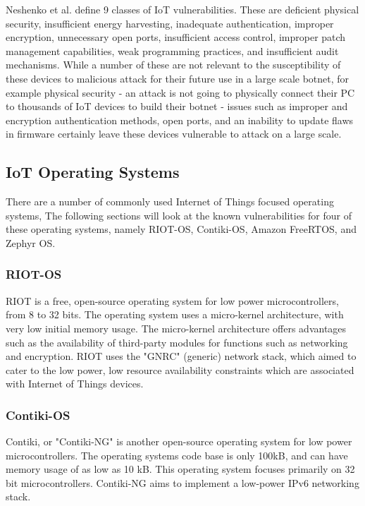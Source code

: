 Neshenko et al.\cite{neshenko_2019} define 9 classes of IoT vulnerabilities. These are
deficient physical security, insufficient energy harvesting, inadequate
authentication, improper encryption, unnecessary open ports, insufficient access
control, improper patch management capabilities, weak programming practices, and
insufficient audit mechanisms. While a number of these are not relevant to the
susceptibility of these devices to malicious attack for their future use in a
large scale botnet, for example physical security - an attack is not going to
physically connect their PC to thousands of IoT devices to build their botnet -
issues such as improper and encryption authentication methods, open ports, and
an inability to update flaws in firmware certainly leave these devices
vulnerable to attack on a large scale.

\subsection{IoT Operating Systems}

There are a number of commonly used Internet of Things focused operating
systems, The following sections will look at the known vulnerabilities for four
of these operating systems, namely RIOT-OS, Contiki-OS, Amazon FreeRTOS, and
Zephyr OS.

\subsubsection{RIOT-OS}

RIOT is a free, open-source operating system for low power microcontrollers,
from 8 to 32 bits. The operating system uses a micro-kernel architecture, with
very low initial memory usage\cite{riotDocs}. The micro-kernel architecture offers advantages
such as the availability of third-party modules for functions such as networking
and encryption. RIOT uses the "GNRC" (generic) network stack, which aimed to
cater to the low power, low resource availability constraints which are
associated with Internet of Things devices\cite{lenders}.

\subsubsection{Contiki-OS}

Contiki, or "Contiki-NG" is another open-source operating system for low power
microcontrollers. The operating systems code base is only 100kB, and can have
memory usage of as low as 10 kB. This operating system focuses primarily on 32
bit microcontrollers. Contiki-NG aims to implement a low-power IPv6 networking
stack.


